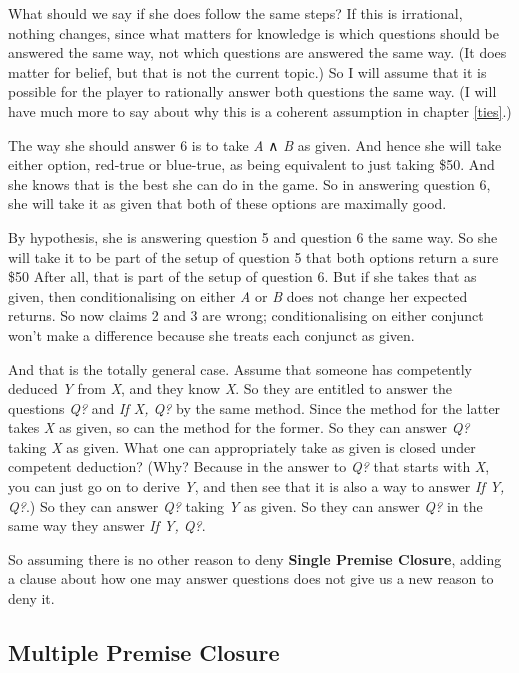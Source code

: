 \documentclass[
  11pt,
]{book}
\begin{document}
What should we say if she does follow the same steps? If this is irrational, nothing changes, since what matters for knowledge is which questions should be answered the same way, not which questions are answered the same way. (It does matter for belief, but that is not the current topic.) So I will assume that it is possible for the player to rationally answer both questions the same way. (I will have much more to say about why this is a coherent assumption in chapter \ref{ties}.)

The way she should answer 6 is to take \emph{A} ∧ \emph{B} as given. And hence she will take either option, red-true or blue-true, as being equivalent to just taking \$50. And she knows that is the best she can do in the game. So in answering question 6, she will take it as given that both of these options are maximally good.

By hypothesis, she is answering question 5 and question 6 the same way. So she will take it to be part of the setup of question 5 that both options return a sure \$50 After all, that is part of the setup of question 6. But if she takes that as given, then conditionalising on either \emph{A} or \emph{B} does not change her expected returns. So now claims 2 and 3 are wrong; conditionalising on either conjunct won't make a difference because she treats each conjunct as given.

And that is the totally general case. Assume that someone has competently deduced \emph{Y} from \emph{X}, and they know \emph{X}. So they are entitled to answer the questions \emph{Q?} and \emph{If X, Q?} by the same method. Since the method for the latter takes \emph{X} as given, so can the method for the former. So they can answer \emph{Q?} taking \emph{X} as given. What one can appropriately take as given is closed under competent deduction? (Why? Because in the answer to \emph{Q?} that starts with \emph{X}, you can just go on to derive \emph{Y}, and then see that it is also a way to answer \emph{If Y, Q?}.) So they can answer \emph{Q?} taking \emph{Y} as given. So they can answer \emph{Q?} in the same way they answer \emph{If Y, Q?}.

So assuming there is no other reason to deny \textbf{Single Premise Closure}, adding a clause about how one may answer questions does not give us a new reason to deny it.

\hypertarget{andintro}{%
\subsection{Multiple Premise Closure}\label{andintro}}
\end{document}
